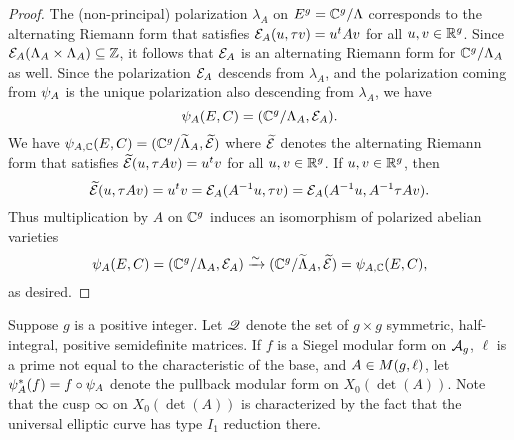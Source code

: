 \documentclass{amsart}
\begin{document}
\begin{proof}
The (non-principal) polarization $\lambda_A$ on $E^g = \mathbb{C}^g/\Lambda$ corresponds to the alternating Riemann form that satisfies $\mathcal{E}_A(u,\tau v) = u^tAv$ for all $u,v \in \mathbb{R}^g$. Since $\mathcal{E}_A(\Lambda_A \times \Lambda_A) \subseteq \mathbb{Z}$, it follows that $\mathcal{E}_A$ is an alternating Riemann form for $\mathbb{C}^g/\Lambda_A$ as well.
Since the polarization $\mathcal{E}_A$ descends from $\lambda_A$, and the polarization coming from $\psi_{A}$ is the unique polarization also descending from $\lambda_A$, we have
\[
  \psi_{A}(E,C) = (\mathbb{C}^g/\Lambda_A, \mathcal{E}_A).
\]
We have ${\psi}_{A, \mathbb{C}}(E,C) = (\mathbb{C}^g/\widetilde{\Lambda}_A, \widetilde{\mathcal{E}})$ where
 $\widetilde{\mathcal{E}}$ denotes the %
alternating Riemann form %
that satisfies %
$\widetilde{\mathcal{E}}(u, \tau A v) = u^tv$ for all $u,v \in \mathbb{R}^g$. If $u, v \in \mathbb{R}^g$, then
$$  \widetilde{\mathcal{E}}(u, \tau A v) = u^tv
                          = \mathcal{E}_A(A^{-1}u, \tau v)
                          = \mathcal{E}_{A}(A^{-1}u, A^{-1}\tau Av).$$
Thus multiplication by $A$ on $\mathbb{C}^g$ induces an isomorphism of polarized abelian varieties
\[
  \psi_{A}(E,C) = (\mathbb{C}^g/\Lambda_A, \mathcal{E}_A) \xrightarrow{\sim} (\mathbb{C}^g/\widetilde{\Lambda}_A, \widetilde{\mathcal{E}}) = {\psi}_{A, \mathbb{C}}(E,C),
\]
as desired.
\end{proof}

Suppose $g$ is a positive integer.
   Let $\mathscr{Q}$ denote the set of $g \times g$ symmetric, half-integral, positive semidefinite matrices.
   If $f$ is a Siegel modular form on $\mathcal{A}_g$, $\ell$ is a prime not equal to the characteristic of the base, and $A\in M(g,\ell)$, let $\psi_{A}^*(f) = f \circ \psi_{A}$ denote the pullback modular form on $X_0(\det(A))$.
     Note that the cusp $\infty$ on $X_0(\det(A))$ is characterized by the fact that the universal elliptic curve has type $I_1$ reduction there.
\end{document}
